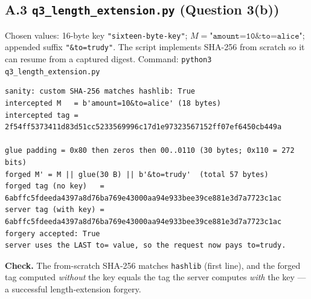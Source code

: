 \documentclass[11pt,a4paper]{article}
\begin{document}
\subsection*{A.3 \texttt{q3\_length\_extension.py} (Question 3(b))}
Chosen values: 16-byte key \texttt{"sixteen-byte-key"}; $M=\texttt{"amount=10\&to=alice"}$; appended
suffix \texttt{"\&to=trudy"}. The script implements SHA-256 from scratch so it can resume from a captured
digest. Command: \texttt{python3 q3\_length\_extension.py}
\begin{Verbatim}[fontsize=\footnotesize, frame=single]
sanity: custom SHA-256 matches hashlib: True
intercepted M   = b'amount=10&to=alice' (18 bytes)
intercepted tag = 2f54ff5373411d83d51cc5233569996c17d1e97323567152ff07ef6450cb449a

glue padding = 0x80 then zeros then 00..0110 (30 bytes; 0x110 = 272 bits)
forged M' = M || glue(30 B) || b'&to=trudy'  (total 57 bytes)
forged tag (no key)   = 6abffc5fdeeda4397a8d76ba769e43000aa94e933bee39ce881e3d7a7723c1ac
server tag (with key) = 6abffc5fdeeda4397a8d76ba769e43000aa94e933bee39ce881e3d7a7723c1ac
forgery accepted: True
server uses the LAST to= value, so the request now pays to=trudy.
\end{Verbatim}
\textbf{Check.} The from-scratch SHA-256 matches \texttt{hashlib} (first line), and the forged tag
computed \emph{without} the key equals the tag the server computes \emph{with} the key --- a successful
length-extension forgery.
\end{document}
